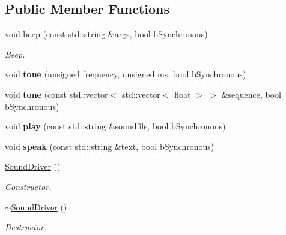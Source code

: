 \subsection*{Public Member Functions}
\begin{DoxyCompactItemize}
\item 
\mbox{\label{classSoundDriver_a33bbfa860cd88f113d1fbf4bf68708ba}} 
void \hyperlink{classSoundDriver_a33bbfa860cd88f113d1fbf4bf68708ba}{beep} (const std\+::string \&args, bool b\+Synchronous)
\begin{DoxyCompactList}\small\item\em Beep. \end{DoxyCompactList}\item 
\mbox{\label{classSoundDriver_a73ac421559404c201308915ad9e4f8e0}} 
void {\bfseries tone} (unsigned frequency, unsigned ms, bool b\+Synchronous)
\item 
\mbox{\label{classSoundDriver_a39ea1b35ab6091e79663fa489cdcff25}} 
void {\bfseries tone} (const std\+::vector$<$ std\+::vector$<$ float $>$ $>$ \&sequence, bool b\+Synchronous)
\item 
\mbox{\label{classSoundDriver_afd64ca3d517d01947d514eb689027eea}} 
void {\bfseries play} (const std\+::string \&soundfile, bool b\+Synchronous)
\item 
\mbox{\label{classSoundDriver_a44869623a4c7ad03e9a65388647bc10c}} 
void {\bfseries speak} (const std\+::string \&text, bool b\+Synchronous)
\item 
\mbox{\label{classSoundDriver_aa45970b1e9155eb51a155cc7ef4389dc}} 
\hyperlink{classSoundDriver_aa45970b1e9155eb51a155cc7ef4389dc}{Sound\+Driver} ()
\begin{DoxyCompactList}\small\item\em Constructor. \end{DoxyCompactList}\item 
\mbox{\label{classSoundDriver_a45845cb8587a626a4ab6a2c53dcdf7c0}} 
\hyperlink{classSoundDriver_a45845cb8587a626a4ab6a2c53dcdf7c0}{$\sim$\+Sound\+Driver} ()
\begin{DoxyCompactList}\small\item\em Destructor. \end{DoxyCompactList}\item 

\end{DoxyCompactItemize}
